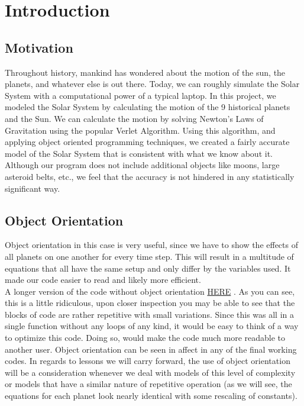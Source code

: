 \documentclass{article}
\begin{document}
\newpage

\section{Introduction}


\subsection{Motivation}
Throughout history, mankind has wondered about the motion of the sun, the planets, and whatever else is out there. Today, we can roughly simulate the Solar System with a computational power of a typical laptop. In this project, we modeled the Solar System by calculating the motion of the 9 historical planets and the Sun. We can calculate the motion by solving Newton's Laws of Gravitation using the popular Verlet Algorithm. Using this algorithm, and applying object oriented programming techniques, we created a fairly accurate model of the Solar System that is consistent with what we know about it. Although our program does not include additional objects like moons, large asteroid belts, etc., we feel that the accuracy is not hindered in any statistically significant way.

\subsection{Object Orientation}
Object orientation in this case is very useful, since we have to show the effects of all planets on one another for every time step. This will result in a multitude of equations that all have the same setup and only differ by the variables used. It made our code easier to read and likely more efficient.\\
A longer version of the code without object orientation \href{https://github.com/nathawkins/PHY480MSU/blob/master/project3/src/Python%20Files/hard_code_the_whole_shabang.py}{HERE}
. As you can see, this is a little ridiculous, upon closer inspection you may be able to see that the blocks of code are rather repetitive with small variations. Since this was all in a single function without any loops of any kind, it would be easy to think of a way to optimize this code. Doing so, would make the code much more readable to another user. Object orientation can be seen in affect in any of the final working codes. In regards to lessons we will carry forward, the use of object orientation will be a consideration whenever we deal with models of this level of complexity or models that have a similar nature of repetitive operation (as we will see, the equations for each planet look nearly identical with some rescaling of constants).
\end{document}
